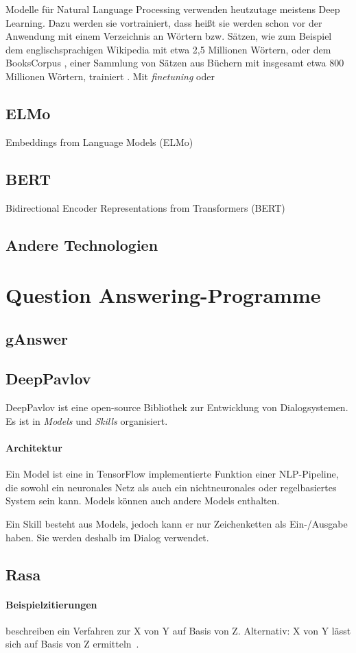 Modelle für Natural Language Processing verwenden heutzutage meistens Deep Learning.
Dazu werden sie vortrainiert, dass heißt sie werden schon vor der Anwendung mit einem Verzeichnis an Wörtern bzw. Sätzen,
wie zum Beispiel dem englischsprachigen Wikipedia mit etwa 2,5 Millionen Wörtern,
oder dem BooksCorpus \citep{bookscorpus},
einer Sammlung von Sätzen aus Büchern mit insgesamt etwa 800 Millionen Wörtern,
trainiert \citep{BERT}.
Mit \emph{finetuning} oder

\subsection{ELMo}

Embeddings from Language Models (ELMo)

\subsection{BERT}

Bidirectional Encoder Representations from Transformers (BERT)

\subsection{Andere Technologien}

\section{Question Answering-Programme}

\subsection{gAnswer}
\subsection{DeepPavlov}
DeepPavlov ist eine open-source Bibliothek zur Entwicklung von Dialogsystemen.
Es ist in \emph{Models} und \emph{Skills} organisiert.

\paragraph{Architektur}
Ein Model ist eine in TensorFlow implementierte Funktion einer NLP-Pipeline,
die sowohl ein neuronales Netz als auch ein nichtneuronales oder regelbasiertes System sein kann.
Models können auch andere Models enthalten.

Ein Skill besteht aus Models, jedoch kann er nur Zeichenketten als Ein-/Ausgabe haben.
Sie werden deshalb im Dialog verwendet.

\subsection{Rasa}


\paragraph{Beispielzitierungen}
\citet{sniktec} beschreiben ein Verfahren zur X von Y auf Basis von Z.
Alternativ: X von Y lässt sich auf Basis von Z ermitteln~\citep{sniktec}.
